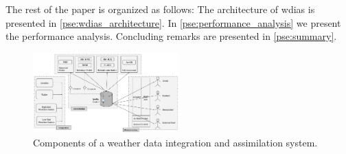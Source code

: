 \documentclass[conference]{IEEEtran}
\begin{document}
The rest of the paper is organized as follows: The architecture of \acrshort{wdias} is presented in \cref{pse:wdias_architecture}. In \cref{pse:performance_analysis} we present the performance analysis. Concluding remarks are presented in \cref{pse:summary}.


\begin{figure}[tb!]
\centerline{\includegraphics[width=0.5\textwidth]{images/weather_data_system_components_p1.pdf}}
\caption{Components of a weather data integration and assimilation system.}
\label{pfi:wdia_components}
\end{figure}

\end{document}

